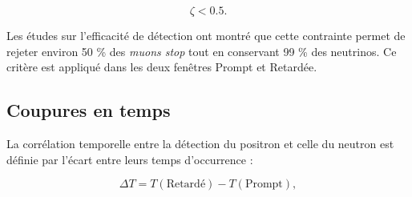 \begin{equation}
    \zeta < 0.5.
\end{equation}

Les études sur l'efficacité de détection ont montré que cette contrainte permet de rejeter environ 50 \% des \textit{muons stop} tout en conservant 99 \% des neutrinos. Ce critère est appliqué dans les deux fenêtres Prompt et Retardée.

\bigbreak


\subsection{Coupures en temps}
\label{sec:time_cuts_pair_search}

La corrélation temporelle entre la détection du positron et celle du neutron est définie par l'écart entre leurs temps d'occurrence :

\begin{equation}
    \Delta T = T(\textrm{Retardé}) - T(\textrm{Prompt}),
\end{equation}

\bigbreak

